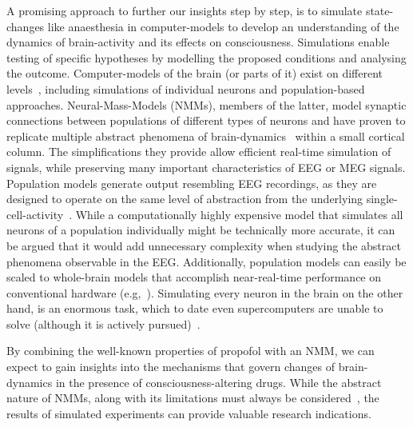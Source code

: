 A promising approach to further our insights step by step, is to simulate state-changes
like anaesthesia in computer-models to develop an understanding of the dynamics of brain-activity and its
effects on consciousness. %
Simulations enable testing of specific hypotheses by modelling the proposed conditions and analysing the outcome.
Computer-models of the brain (or parts of it) exist on different levels~\cite{panahi_generative_2021},
including simulations of individual neurons and population-based approaches.
Neural-Mass-Models (NMMs), members of the latter, model synaptic connections between populations of different types
of neurons and have proven to replicate multiple abstract phenomena of brain-dynamics~\cite{bojak_neural_2014,
    knösche_jansen-rit_2014} within a small cortical column.
The simplifications they provide allow efficient real-time simulation of signals,
while preserving many important characteristics of EEG or MEG signals.
Population models generate output resembling EEG recordings,
as they are designed to operate on the same level of abstraction
from the underlying single-cell-activity~\cite{deco_dynamic_2008}.
While a computationally highly expensive model that simulates all neurons of a population individually might
be technically more accurate,
it can be argued that it would add unnecessary complexity
when studying the abstract phenomena observable in the EEG.
Additionally, population models can easily be scaled to whole-brain models
that accomplish near-real-time performance on conventional hardware (e.g,~\cite{bensaid_coalia_2019}).
Simulating every neuron in the brain on the other hand, is an enormous task,
which to date even supercomputers are unable to solve (although it is actively pursued)~\cite{jordan_extremely_2018}.

By combining the well-known properties of propofol with an NMM, we can expect to gain insights into the mechanisms that
govern changes of brain-dynamics in the presence of consciousness-altering drugs.
While the abstract nature of NMMs, along with its limitations must always be
considered~\cite{deschle_validity_2021},
the results of simulated experiments can provide valuable research indications.
